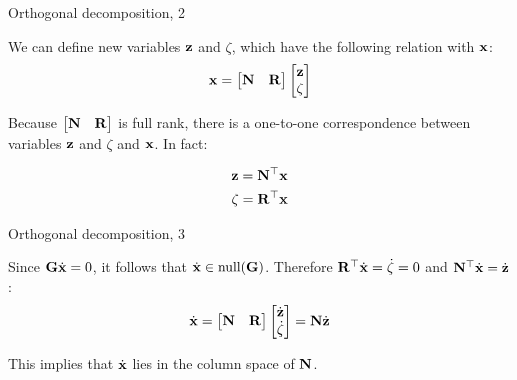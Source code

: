 \documentclass{beamer}
\begin{document}
\begin{frame}{Orthogonal decomposition, 2}
	\begin{flushleft}
		
		We can define new variables $\mathbf{z}$ and $\zeta$, which have the following relation with $\mathbf{x}$:
			\begin{align}
				\mathbf{x} = 
				\begin{bmatrix}
					\mathbf{N} & \mathbf{R}
				\end{bmatrix}
				\begin{bmatrix}
					\mathbf{z} \\ \zeta
				\end{bmatrix}
			\end{align}		
		
		Because $\begin{bmatrix}
			\mathbf{N} & \mathbf{R}
		\end{bmatrix}$ is full rank, there is a one-to-one correspondence between variables $\mathbf{z}$ and $\zeta$ and $\mathbf{x}$. In fact:
	
		\begin{align}
			\mathbf{z} = \mathbf{N}^\top \mathbf{x} \\
			\zeta = \mathbf{R}^\top \mathbf{x} 
		\end{align}
		
		
	\end{flushleft}
\end{frame}



\begin{frame}{Orthogonal decomposition, 3}
	\begin{flushleft}
		
		Since $\mathbf{G} \dot{\mathbf{x}} = 0$, it follows that $\dot{\mathbf{x}} \in \text{null}(\mathbf{G})$. Therefore $\mathbf{R}^\top \dot{\mathbf{x}} = \dot \zeta =  0$ and $\mathbf{N}^\top \dot{\mathbf{x}} = \dot{\mathbf{z}}$:
		\begin{align}
			\dot{\mathbf{x}} = \begin{bmatrix}
				\mathbf{N} & \mathbf{R}
			\end{bmatrix}
			\begin{bmatrix}
		 		\dot{\mathbf{z}} \\ \dot \zeta
			\end{bmatrix} = \mathbf{N}\dot{\mathbf{z}}
		\end{align}
		
		This implies that $\dot{\mathbf{x}}$ lies in the column space of $\mathbf{N}$.
		
	\end{flushleft}
\end{frame}
\end{document}
